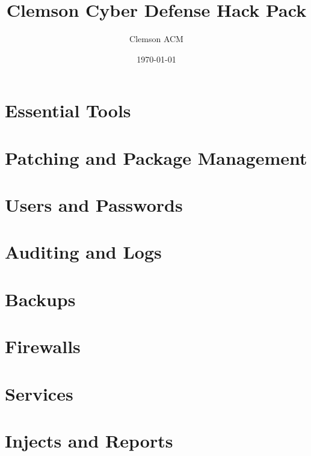 \documentclass[letterpaper, 10pt]{report}
\title{Clemson Cyber Defense Hack Pack}
\author{Clemson ACM}
\date{\today}
\begin{document}
\maketitle





\tableofcontents

\chapter{Essential Tools}




\chapter{Patching and Package Management}

\chapter{Users and Passwords}

\chapter{Auditing and Logs}

\chapter{Backups}

\chapter{Firewalls}



\chapter{Services}



\chapter{Injects and Reports}




\printindex


\end{document}
